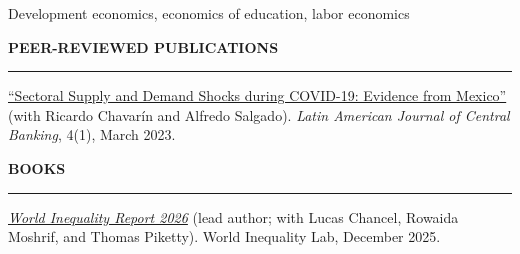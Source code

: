 \documentclass[11pt,letterpaper]{article}
\renewcommand{\section}[1]{%
  \vspace{0.8em}%
  {\large\bfseries\MakeUppercase{#1}}%
  \vspace{0.3em}%
  \hrule%
  \vspace{0.4em}%
}
\begin{document}
Development economics, economics of education, labor economics


\section{Peer-Reviewed Publications}

\href{https://doi.org/10.1016/j.latcb.2022.100083}{``Sectoral Supply and Demand Shocks during COVID-19: Evidence from Mexico''} (with Ricardo Chavar\'{i}n and Alfredo Salgado). \textit{Latin American Journal of Central Banking}, 4(1), March 2023.


\section{Books}

\href{https://wir2026.wid.world/}{\textit{World Inequality Report 2026}} (lead author; with Lucas Chancel, Rowaida Moshrif, and Thomas Piketty). World Inequality Lab, December 2025.
\end{document}
